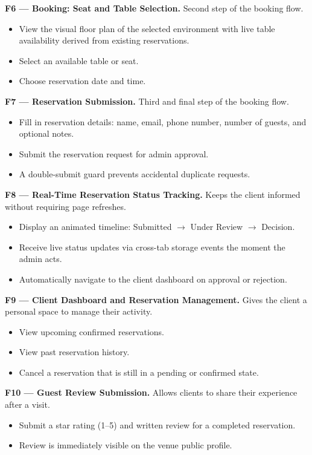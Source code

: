 \documentclass[12pt,a4paper]{article}
\begin{document}
\textbf{F6 --- Booking: Seat and Table Selection.}
Second step of the booking flow.
\begin{itemize}[leftmargin=1.5em, topsep=2pt, itemsep=1pt]
    \item View the visual floor plan of the selected environment with
          live table availability derived from existing reservations.
    \item Select an available table or seat.
    \item Choose reservation date and time.
\end{itemize}

\textbf{F7 --- Reservation Submission.}
Third and final step of the booking flow.
\begin{itemize}[leftmargin=1.5em, topsep=2pt, itemsep=1pt]
    \item Fill in reservation details: name, email, phone number, number
          of guests, and optional notes.
    \item Submit the reservation request for admin approval.
    \item A double-submit guard prevents accidental duplicate requests.
\end{itemize}

\textbf{F8 --- Real-Time Reservation Status Tracking.}
Keeps the client informed without requiring page refreshes.
\begin{itemize}[leftmargin=1.5em, topsep=2pt, itemsep=1pt]
    \item Display an animated timeline: Submitted $\to$ Under Review
          $\to$ Decision.
    \item Receive live status updates via cross-tab storage events the
          moment the admin acts.
    \item Automatically navigate to the client dashboard on approval or
          rejection.
\end{itemize}

\textbf{F9 --- Client Dashboard and Reservation Management.}
Gives the client a personal space to manage their activity.
\begin{itemize}[leftmargin=1.5em, topsep=2pt, itemsep=1pt]
    \item View upcoming confirmed reservations.
    \item View past reservation history.
    \item Cancel a reservation that is still in a pending or confirmed state.
\end{itemize}

\textbf{F10 --- Guest Review Submission.}
Allows clients to share their experience after a visit.
\begin{itemize}[leftmargin=1.5em, topsep=2pt, itemsep=1pt]
    \item Submit a star rating (1--5) and written review for a completed reservation.
    \item Review is immediately visible on the venue public profile.
\end{itemize}
\end{document}
